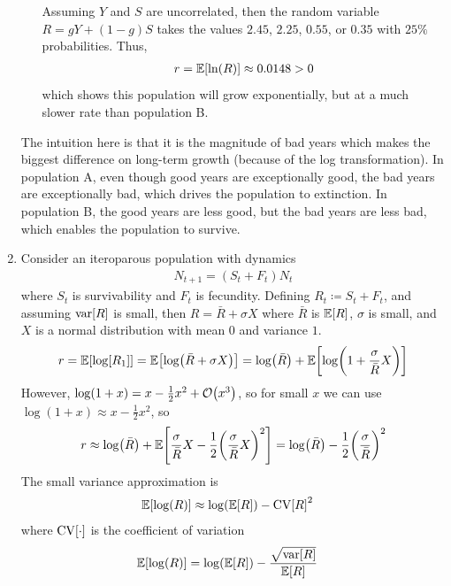 \documentclass{article} %
\theoremstyle{plain}
\newcommand{\expec}[1]{\mathbb{E}\qty[#1]}
\newcommand{\CV}[1]{\text{CV}\qty[#1]}
\newcommand{\vari}[1]{\text{var}\qty[#1]}
\numberwithin{equation}{section} %
\numberwithin{figure}{section} %
\numberwithin{table}{section} %
\begin{document}
\begin{enumerate}[\ \ (a)]
\begin{enumerate}[Pop.~A:\ ]
                Assuming $Y$ and $S$ are uncorrelated, then the random variable $R = gY + (1-g)S$ takes the values $2.45$, $2.25$, $0.55$, or $0.35$ with $25\%$ probabilities.  Thus,
                \begin{align*}
                    r = \expec{\ln(R)} \approx 0.0148 > 0
                \end{align*}
                which shows this population will grow exponentially, but at a much slower rate than population B.
        \end{enumerate}
        The intuition here is that it is the magnitude of bad years which makes the biggest difference on long-term growth (because of the log transformation).  In population A, even though good years are exceptionally good, the bad years are exceptionally bad, which drives the population to extinction.  In population B, the good years are less good, but the bad years are less bad, which enables the population to survive.
    \item
        Consider an iteroparous population with dynamics
        \begin{align*}
            N_{t+1} = (S_t + F_t)N_t
        \end{align*}
        where $S_t$ is survivability and $F_t$ is fecundity.  Defining $R_t \coloneqq S_t + F_t$, and assuming $\vari{R}$ is small, then $R = \bar{R} + \sigma X$ where $\bar{R}$ is $\expec{R}$, $\sigma$ is small, and $X$ is a normal distribution with mean $0$ and variance $1$.
        \begin{align*}
            r = \expec{\log[R_1]} = \expec{\log(\bar{R} + \sigma X)} = \log(\bar{R}) + \expec{\log(1 + \frac{\sigma}{\bar{R}}X)}
        \end{align*}
        However, $\log(1 + x) = x - \frac{1}{2}x^2 + \order{x^3}$, so for small $x$ we can use $\log(1 + x) \approx x - \frac{1}{2}x^2$, so
        \begin{align*}
            r \approx \log(\bar{R}) + \expec{\frac{\sigma}{\bar{R}}X - \frac{1}{2}\qty(\frac{\sigma}{\bar{R}}X)^2} = \log(\bar{R}) - \frac{1}{2}\qty(\frac{\sigma}{\bar{R}})^2
        \end{align*}
        The small variance approximation is
        \begin{align*}
            \expec{\log(R)} &\approx \log(\expec{R}) - \CV{R}^2
        \end{align*}
        where $\CV{\cdot}$ is the coefficient of variation
        \begin{align*}
            \expec{\log(R)} &= \log(\expec{R}) - \frac{\sqrt{\vari{R}}}{\expec{R}}

\end{align*}
\end{enumerate}
\end{document}
